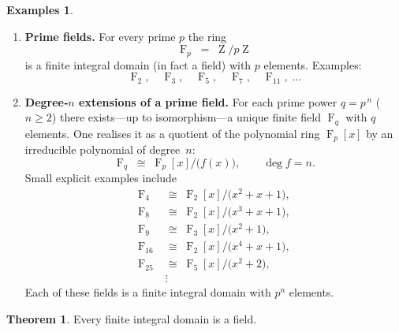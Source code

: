 \documentclass[12pt]{article}
\DeclareMathOperator{\F}{F}
\DeclareMathOperator{\Z}{Z}
\theoremstyle{definition} %
\newtheorem{theorem}{Theorem}
\newtheorem{examples}{Examples}
\theoremstyle{plain} %
\begin{document}
    \begin{examples}
      \leavevmode
      \begin{enumerate}
        \item \textbf{Prime fields.}\;
          For every prime $p$ the ring
          \[
            \F_{p}\;=\;\Z/p\Z
          \]
          is a finite integral domain (in fact a field) with $p$ elements.
          Examples:
          \[
            \F_{2},\quad
            \F_{3},\quad
            \F_{5},\quad
            \F_{7},\quad
            \F_{11},\;\dots
          \]
    
        \item \textbf{Degree‑$n$ extensions of a prime field.}\;
          For each prime power $q=p^{\,n}$ ($n\ge 2$) there exists—up to isomorphism—a unique
          finite field $\F_{q}$ with $q$ elements.  One realises it as a
          quotient of the polynomial ring $\F_{p}[x]$ by an irreducible
          polynomial of degree~$n$:
          \[
            \F_{q}\;\cong\;\F_{p}[x]\big/\bigl(f(x)\bigr),\qquad \deg f = n.
          \]
          Small explicit examples include
          \begin{align*}
            \F_{4} &\;\cong\; \F_{2}[x]\bigl/(x^{2}+x+1\bigr),\\
            \F_{8} &\;\cong\; \F_{2}[x]\bigl/(x^{3}+x+1\bigr),\\
            \F_{9} &\;\cong\; \F_{3}[x]\bigl/(x^{2}+1\bigr),\\
            \F_{16}&\;\cong\; \F_{2}[x]\bigl/(x^{4}+x+1\bigr),\\
            \F_{25}&\;\cong\; \F_{5}[x]\bigl/(x^{2}+2\bigr),\\
            &\;\vdots
          \end{align*}
          Each of these fields is a finite integral domain with $p^{n}$ elements.
      \end{enumerate}
    \end{examples}
    \begin{theorem}
      Every finite integral domain is a field.
      \end{theorem}
      
\end{document}
